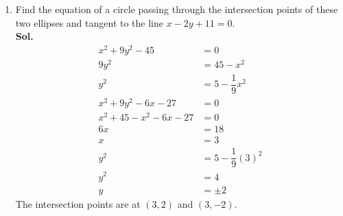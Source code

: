 \documentclass{report}
\newcommand{\sol}{\vspace{1em}\\\textbf{Sol.}}
\begin{document}
\begin{enumerate}
\begin{enumerate}
                    \newpage
              \item Find the equation of a circle passing through the intersection points of these
                    two ellipses and tangent to the line $x - 2y + 11 = 0$. \sol{}
                    \begin{align*}
                        x^2 + 9y^2 - 45          & = 0                     \\
                        9y^2                     & = 45 - x^2              \\
                        y^2                      & = 5 - \dfrac{1}{9}x^2   \\
                        x^2 + 9y^2 - 6x - 27     & = 0                     \\
                        x^2 + 45 - x^2 - 6x - 27 & = 0                     \\
                        6x                       & = 18                    \\
                        x                        & = 3                     \\
                        y^2                      & = 5 - \dfrac{1}{9}(3)^2 \\
                        y^2                      & = 4                     \\
                        y                        & = \pm 2
                    \end{align*}
                    The intersection points are at $(3, 2)$ and $(3, -2)$.


\end{enumerate}
\end{enumerate}
\end{document}
